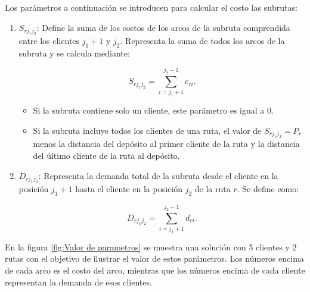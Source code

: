 \documentclass[12pt]{report}
\begin{document}
	Los parámetros a continuación se introducen para calcular el costo las subrutas:

	\begin{enumerate}


		\item{$S_{rj_1j_2}$: Define la suma de los costos de los arcos de la subruta comprendida entre los clientes $j_1+1$ y $j_2$. Representa la suma de todos los arcos de la subruta y se calcula mediante:}

		\[
		S_{rj_1j_2}=\sum\limits_{i=j_1+1}^{j_2-1} c_{ri}.
		\]
		\begin{itemize}
			\item
			Si la subruta contiene solo un cliente, este parámetro es igual a 0.
			\item
			Si la subruta incluye todos los clientes de una ruta, el valor de $S_{rj_1j_2} = P_r$ menos la distancia del depósito al primer cliente de la ruta y la distancia del último cliente de la ruta al depósito.
		\end{itemize}

		\item {$D_{rj_1j_2}$: Representa la demanda total de la subruta desde el cliente en la posición $j_1+1$ hasta el cliente en la posición $j_2$ de la ruta $r$. Se define como:}

		\[
		D_{rj_1j_2}=\sum\limits_{i=j_1+1}^{j_2-1} d_{ri}.
		\]
	\end{enumerate}

	En la figura \ref{fig:Valor de parametros} se muestra una solución con 5 clientes y 2 rutas con el objetivo de ilustrar el valor de estos parámetros. Los números encima de cada arco es el costo del arco, mientras que los números encima de cada cliente representan la demanda de esos clientes.
\end{document}
